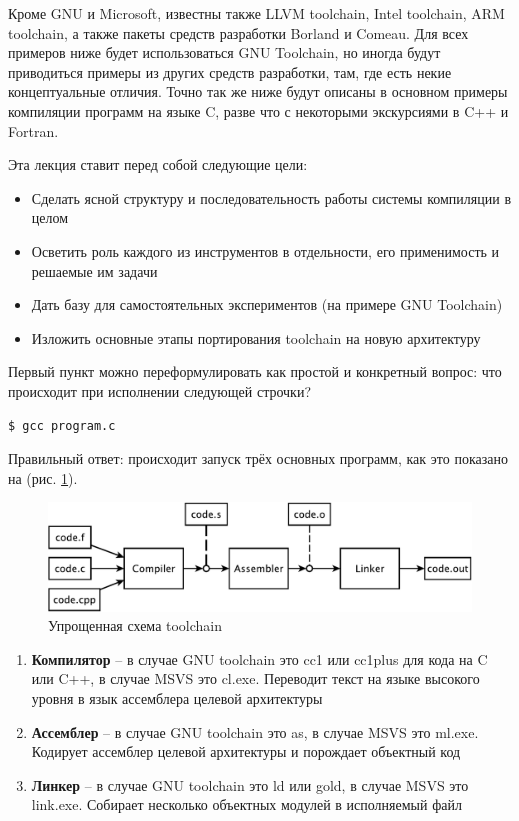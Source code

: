 \documentclass[a4paper,12pt,oneside]{article}
\begin{document}
Кроме GNU и Microsoft, известны также LLVM toolchain, Intel toolchain, ARM toolchain, а также пакеты средств разработки Borland и Comeau. Для всех примеров ниже будет использоваться GNU Toolchain, но иногда будут приводиться примеры из других средств разработки, там, где есть некие концептуальные отличия. Точно так же ниже будут описаны в основном примеры компиляции программ на языке C, разве что с некоторыми экскурсиями в C++ и Fortran.

Эта лекция ставит перед собой следующие цели:

\begin{itemize}
\item Сделать ясной структуру и последовательность работы системы компиляции в целом
\item Осветить роль каждого из инструментов в отдельности, его применимость и решаемые им задачи
\item Дать базу для самостоятельных экспериментов (на примере GNU Toolchain)
\item Изложить основные этапы портирования toolchain на новую архитектуру
\end{itemize}

Первый пункт можно переформулировать как простой и конкретный вопрос: что происходит при исполнении следующей строчки?

\begin{verbatim}
$ gcc program.c
\end{verbatim}

Правильный ответ: происходит запуск трёх основных программ, как это показано на (рис. \ref{fig:simplified_scheme}).

\begin{figure}[ht]
\centering
\includegraphics[width=1.0\textwidth]{illustrations/simplified-scheme-crop.pdf}
\caption{Упрощенная схема toolchain}
\label{fig:simplified_scheme}
\end{figure}

\begin{enumerate}
\item \textbf{Компилятор} -- в случае GNU toolchain это cc1 или cc1plus для кода на C или C++, в случае MSVS это cl.exe. Переводит текст на языке высокого уровня в язык ассемблера целевой архитектуры
\item \textbf{Ассемблер} -- в случае GNU toolchain это as, в случае MSVS это ml.exe. Кодирует ассемблер целевой архитектуры и порождает объектный код
\item \textbf{Линкер} -- в случае GNU toolchain это ld или gold, в случае MSVS это link.exe. Собирает несколько объектных модулей в исполняемый файл
\end{enumerate}
\end{document}
